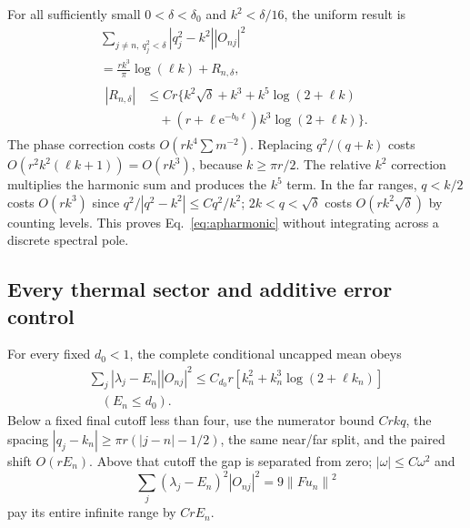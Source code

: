\documentclass[aps,pra,reprint,superscriptaddress,longbibliography]{revtex4-2}
\newcommand{\ee}{\mathrm e}
\newcommand{\norm}[1]{\left\lVert#1\right\rVert}
\begin{document}
For all sufficiently small $0<\delta<\delta_0$ and $k^2<\delta/16$,
the uniform result is
\begin{equation}
 \begin{gathered}
 \sum_{j\ne n,\ q_j^2<\delta}|q_j^2-k^2||O_{nj}|^2\\
   =\frac{rk^3}{\pi}\log(\ell k)+R_{n,\delta},\\
 \begin{aligned}
 |R_{n,\delta}|&\le Cr\{k^2\sqrt\delta+k^3
                  +k^5\log(2+\ell k)\\
 &\quad+(r+\ell\ee^{-b_0\ell})k^3\log(2+\ell k)\}.
 \end{aligned}
 \end{gathered}                                         \label{eq:apharmonic}
\end{equation}
The phase correction costs $O(rk^4\sum m^{-2})$. Replacing
$q^2/(q+k)$ costs $O(r^2k^2(\ell k+1))=O(rk^3)$, because
$k\ge\pi r/2$. The relative $k^2$ correction multiplies the
harmonic sum and produces the $k^5$ term. In the far ranges,
$q<k/2$ costs $O(rk^3)$ since $q^2/|q^2-k^2|\le Cq^2/k^2$;
$2k<q<\sqrt\delta$ costs $O(rk^2\sqrt\delta)$ by counting levels.
This proves Eq.~\eqref{eq:apharmonic} without integrating across
a discrete spectral pole.

\subsection{Every thermal sector and additive error control}

For every fixed $d_0<1$, the complete conditional uncapped mean obeys
\begin{equation}
 \begin{gathered}
 \sum_j|\lambda_j-E_n||O_{nj}|^2
 \le C_{d_0}r[k_n^2+k_n^3\log(2+\ell k_n)]\\
                                      \quad(E_n\le d_0).
 \end{gathered}                                         \label{eq:apworkbound}
\end{equation}
Below a fixed final cutoff less than four, use the numerator bound
$Crkq$, the spacing
$|q_j-k_n|\ge\pi r(|j-n|-1/2)$, the same near/far split, and the
paired shift $O(rE_n)$. Above that cutoff the gap is separated from
zero; $|\omega|\le C\omega^2$ and
\begin{equation}
 \sum_j(\lambda_j-E_n)^2|O_{nj}|^2=9\norm{Fu_n}^2
                                                               \label{eq:apsecondgap}
\end{equation}
pay its entire infinite range by $CrE_n$.
\end{document}
